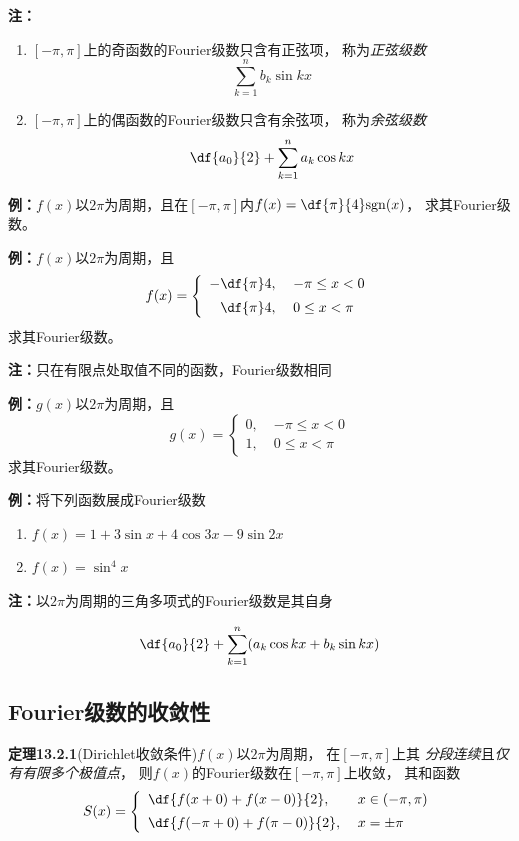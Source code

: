{\bf 注：}
\begin{enumerate}[(1)]
  \setlength{\itemindent}{1cm}
  \item $[-\pi,\pi]$上的奇函数的Fourier级数只含有正弦项， 称为{\it 正弦级数}
  $$\sum\limits_{k=1}^{n}b_k\sin kx$$ 
  \item $[-\pi,\pi]$上的偶函数的Fourier级数只含有余弦项， 称为{\it 余弦级数}
  $$\df{a_0}{2}+\sum\limits_{k=1}^{n}a_k\cos kx$$
\end{enumerate}

{\bf 例：}$f(x)$以$2\pi$为周期，且在$[-\pi,\pi]$内$f(x)=\df{\pi}{4}\mathrm{sgn}(x)$，
求其Fourier级数。

{\bf 例：}$f(x)$以$2\pi$为周期，且
$$f(x)=\left\{\begin{array}{rl}
	-\df{\pi}4,\;& -\pi\leq x<0\\[5pt]
	\df{\pi}4,\;& 0\leq x<\pi
\end{array}\right.$$
求其Fourier级数。

{\bf 注：}只在有限点处取值不同的函数，Fourier级数相同

{\bf 例：}$g(x)$以$2\pi$为周期，且
$$g(x)=\left\{\begin{array}{ll}
	0,\;& -\pi\leq x<0\\
	1,\;& 0\leq x<\pi
\end{array}\right.$$
求其Fourier级数。

{\bf 例：}将下列函数展成Fourier级数
\begin{enumerate}[(1)]
  \setlength{\itemindent}{1cm}
  \item $f(x)=1+3\sin x+4\cos 3x-9\sin 2x$
  \item $f(x)=\sin^4x$
\end{enumerate}

{\bf 注：}以$2\pi$为周期的三角多项式的Fourier级数是其自身

$${\df{a_0}{2}+\sum\limits_{k=1}^{n}(a_k\cos kx+b_k\sin kx)}$$

\subsection{Fourier级数的收敛性}

{\bf 定理13.2.1}(Dirichlet收敛条件)$f(x)$以$2\pi$为周期， 在$[-\pi,\pi]$上其
{\it 分段连续}且{\it 仅有有限多个极值点}， 则$f(x)$的Fourier级数在$[-\pi,\pi]$上收敛，
 其和函数
$$S(x) =\left\{\begin{array}{ll}
	\df{f(x+0)+f(x-0)}{2},\;& x\in(-\pi,\pi) \\[5pt]
	\df{f(-\pi+0)+f(\pi-0)}{2},\;& x=\pm\pi
\end{array}\right.$$

